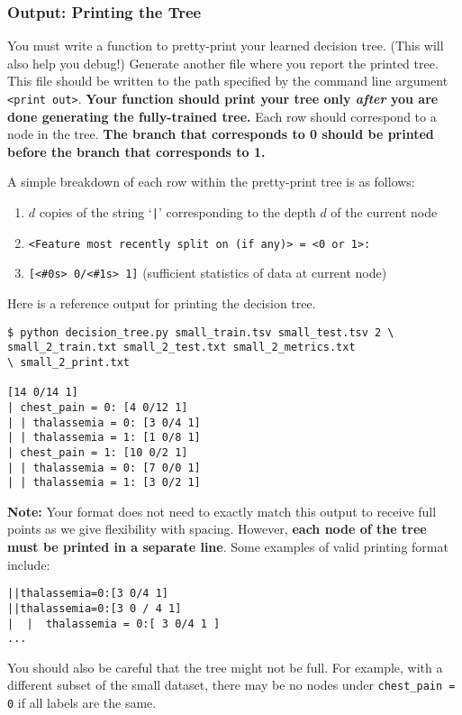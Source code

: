 \documentclass[11pt,addpoints,answers]{exam}
\begin{document}
\subsubsection{Output: Printing the Tree}
\label{sec:printtree}

You must write a function to pretty-print your learned decision tree. (This will also help you debug!) Generate another file where you report the printed tree. This file should be written to the path specified by the command line argument \lstinline{<print out>}. \textbf{Your function should print your tree only \emph{after} you are done generating the fully-trained tree.} Each row should correspond to a node in the tree. \textbf{The branch that corresponds to 0 should be printed before the branch that corresponds to 1.} 

A simple breakdown of each row within the pretty-print tree is as follows: 
\begin{enumerate}
    \item $d$ copies of the string `\texttt{|}' corresponding to the depth $d$ of the current node 
    \item \texttt{<Feature most recently split on (if any)> = <0 or 1>:}
    \item \texttt{[<\#0s> 0/<\#1s> 1]} (sufficient statistics of data at current node)
\end{enumerate}

Here is a reference output for printing the decision tree. 
\begin{lstlisting}[language=Shell]
$ python decision_tree.py small_train.tsv small_test.tsv 2 \ 
small_2_train.txt small_2_test.txt small_2_metrics.txt 
\ small_2_print.txt

[14 0/14 1]
| chest_pain = 0: [4 0/12 1]
| | thalassemia = 0: [3 0/4 1]
| | thalassemia = 1: [1 0/8 1]
| chest_pain = 1: [10 0/2 1]
| | thalassemia = 0: [7 0/0 1]
| | thalassemia = 1: [3 0/2 1]
\end{lstlisting}

\textbf{Note: }Your format does not need to exactly match this output to receive full points as we give flexibility with spacing. However, \textbf{each node of the tree must be printed in a separate line}.
Some examples of valid printing format include:
\begin{lstlisting}[language=Shell]
||thalassemia=0:[3 0/4 1]
||thalassemia=0:[3 0 / 4 1]
|  |  thalassemia = 0:[ 3 0/4 1 ]
...
\end{lstlisting}


You should also be careful that the tree might not be full. For example, with a different subset of the small dataset, there may be no nodes under \lstinline{chest_pain = 0} if all labels are the same.\\
\end{document}
